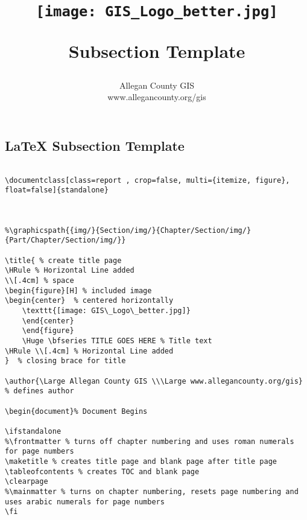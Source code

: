 \documentclass[class=report , crop=false, multi={itemize, figure}, float=false]{standalone}
\title{ %
\HRule %
\\[.4cm] %
\begin{figure}[H] %
\begin{center}	%
	\texttt{[image: GIS\_Logo\_better.jpg]}
	\end{center}
	\end{figure}
	\Huge \bfseries Subsection Template %
\HRule \\[.4cm] %
}  %
\author{\Large Allegan County GIS \\\Large www.allegancounty.org/gis} %
\begin{document}

\ifstandalone
\maketitle %
\clearpage
\fi

\subsection{\LaTeX{} Subsection Template}
	\medskip 
	
\begin{verbatim}

\documentclass[class=report , crop=false, multi={itemize, figure}, float=false]{standalone}



%\graphicspath{{img/}{Section/img/}{Chapter/Section/img/}{Part/Chapter/Section/img/}}

\title{ % create title page
\HRule % Horizontal Line added
\\[.4cm] % space
\begin{figure}[H] % included image
\begin{center}	% centered horizontally
	\texttt{[image: GIS\_Logo\_better.jpg]}
	\end{center}
	\end{figure}
	\Huge \bfseries TITLE GOES HERE % Title text
\HRule \\[.4cm] % Horizontal Line added
}  % closing brace for title

\author{\Large Allegan County GIS \\\Large www.allegancounty.org/gis} % defines author

\begin{document}% Document Begins

\ifstandalone
%\frontmatter % turns off chapter numbering and uses roman numerals for page numbers
\maketitle % creates title page and blank page after title page
\tableofcontents % creates TOC and blank page
\clearpage
%\mainmatter % turns on chapter numbering, resets page numbering and uses arabic numerals for page numbers
\fi


\end{verbatim}
\end{document}
